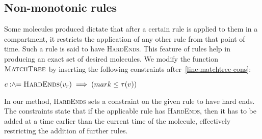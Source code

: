 \subsection{Non-monotonic rules}
Some molecules produced dictate that after a certain rule is applied to them in a compartment, it restricts the application of any other rule from that point of time. Such a rule is said to have \textsc{HardEnds}. This feature of rules help in producing an exact set of desired molecules. We modify the function $\textsc{MatchTree}$ by inserting the following constraints after~\ref{line:matchtree-cons}:
\begin{algorithmic}[1]
  \vspace{1ex}
  \State $c \mathrel{:\hspace{-3pt}\land\hspace{-3pt}=} \textsc{HardEnds}(v_r) \implies (mark \leq \tau(v))$
  \vspace{1ex}
\end{algorithmic}
In our method, \textsc{HardEnds} sets a constraint on the given rule to have hard ends. The constraints state that if the applicable rule has \textsc{HardEnds}, then it has to be added at a time earlier than the current time of the molecule, effectively restricting the addition of further rules.




